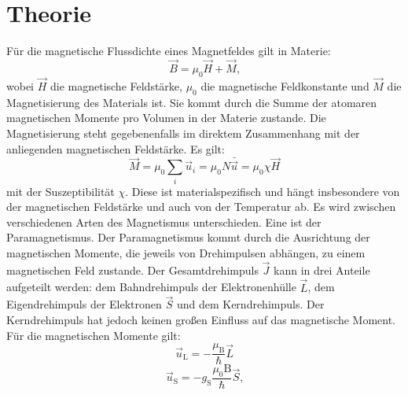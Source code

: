 
\section{Theorie}
\label{sec:Theorie}


Für die magnetische Flussdichte eines Magnetfeldes gilt in Materie:
\begin{equation}
\vec{B}=\mu_0 \vec{H}+\vec{M}\text{,}
\end{equation}
wobei $\vec{H}$ die magnetische Feldstärke, $\mu_0$ die magnetische Feldkonstante und $\vec{M}$ die Magnetisierung des Materials ist. Sie kommt durch die Summe der atomaren magnetischen Momente pro Volumen in der Materie zustande. Die Magnetisierung steht gegebenenfalls im direktem Zusammenhang mit der anliegenden magnetischen Feldstärke. Es gilt:
\begin{equation}
	\vec{M}=\mu_0 \sum\limits_{i} \vec{u}_i = \mu_0 N \bar{\vec{u}} =\mu_0 \chi \vec{H}
\end{equation}
mit der Suszeptibilität $\chi$. Diese ist materialspezifisch und hängt insbesondere von der magnetischen Feldstärke und auch von der Temperatur ab. Es wird zwischen verschiedenen Arten des Magnetismus unterschieden. Eine ist der Paramagnetismus. Der Paramagnetismus kommt durch die Ausrichtung der magnetischen Momente, die jeweils von Drehimpulsen abhängen, zu einem magnetischen Feld zustande. Der Gesamtdrehimpuls $\vec{J}$ kann in drei Anteile aufgeteilt werden: dem Bahndrehimpuls der Elektronenhülle $\vec{L}$, dem Eigendrehimpuls der Elektronen $\vec{S}$ und dem Kerndrehimpuls. Der Kerndrehimpuls hat jedoch keinen großen Einfluss auf das magnetische Moment. Für die magnetischen Momente gilt:
\begin{equation}
	\vec{u}_\text{L}=-\frac{\mu_\text{B}}{\hslash} \vec{L}
\end{equation}
\begin{equation}
	\vec{u}_\text{S}=-g_\text{S} \frac{\mu_0\text{B}}{\hslash} \vec{S}\text{,}
\end{equation}
